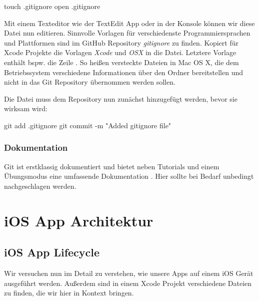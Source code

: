 \documentclass[parskip=half, final]{scrreprt}
\begin{document}
\begin{shcode}
touch .gitignore
open .gitignore
\end{shcode}

Mit einem Texteditor wie der TextEdit App oder  in der Konsole können wir diese Datei nun editieren. Sinnvolle Vorlagen für verschiedenste Programmiersprachen und Plattformen sind im GitHub Repository \emph{gitignore}  zu finden. Kopiert für Xcode Projekte die Vorlagen \emph{Xcode}  und \emph{OSX}  in die  Datei. Letztere Vorlage enthält bspw. die Zeile . So heißen versteckte Dateien in Mac OS X, die dem Betriebssystem verschiedene Informationen über den Ordner bereitstellen  und nicht in das Git Repository übernommen werden sollen.

Die  Datei muss dem Repository nun zunächst hinzugefügt werden, bevor sie wirksam wird:

\begin{shcode}
git add .gitignore
git commit -m "Added gitignore file"
\end{shcode}

\subsection{Dokumentation}\label{sec:git_doku}

Git  ist erstklassig dokumentiert und bietet neben Tutorials und einem Übungsmodus  eine umfassende Dokumentation . Hier sollte bei Bedarf unbedingt nachgeschlagen werden.



\chapter{iOS App Architektur}


\section{iOS App Lifecycle}

Wir versuchen nun im Detail zu verstehen, wie unsere Apps auf einem iOS Gerät ausgeführt werden. Außerdem sind in einem Xcode Projekt verschiedene Dateien zu finden, die wir hier in Kontext bringen.
\end{document}
